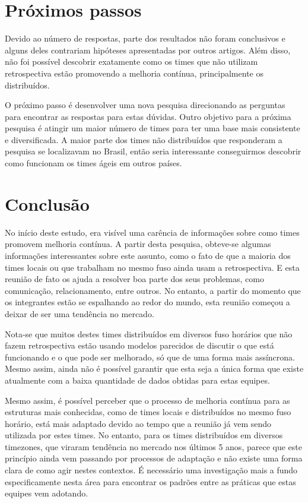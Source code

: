 \documentclass[12pt]{article}
\begin{document}
\section{Próximos passos}

Devido ao número de respostas, parte dos resultados não foram conclusivos e alguns deles contrariam hipóteses apresentadas por outros artigos. Além disso, não foi possível descobrir exatamente como os times que não utilizam retrospectiva estão promovendo a melhoria contínua, principalmente os distribuídos.

O próximo passo é desenvolver uma nova pesquisa direcionando as perguntas para encontrar as respostas para estas dúvidas. Outro objetivo para a próxima pesquisa é atingir um maior número de times para ter uma base mais consistente e diversificada. A maior parte dos times não distribuídos que responderam a pesquisa se localizavam no Brasil, então seria interessante conseguirmos descobrir como funcionam os times ágeis em outros países.

\section{Conclusão}

No início deste estudo, era visível uma carência de informações sobre como times promovem melhoria contínua. A partir desta pesquisa, obteve-se algumas informações interessantes sobre este assunto, como o fato de que a maioria dos times locais ou que trabalham no mesmo fuso ainda usam a retrospectiva. E esta reunião de fato os ajuda a resolver boa parte dos seus problemas, como comunicação, relacionamento, entre outros. No entanto, a partir do momento que os integrantes estão se espalhando ao redor do mundo, esta reunião começou a deixar de ser uma tendência no mercado.

Nota-se que muitos destes times distribuídos em diversos fuso horários que não fazem retrospectiva estão usando modelos parecidos de discutir o que está funcionando e o que pode ser melhorado, só que de uma forma mais assíncrona. Mesmo assim, ainda não é possível garantir que esta seja a única forma que existe atualmente com a baixa quantidade de dados obtidas para estas equipes.

Mesmo assim, é possível perceber que o processo de melhoria contínua para as estruturas mais conhecidas, como de times locais e distribuídos no mesmo fuso horário, está mais adaptado devido ao tempo que a reunião já vem sendo utilizada por estes times. No entanto, para os times distribuídos em diversos timezones, que viraram tendência no mercado nos últimos 5 anos, parece que este princípio ainda vem passando por processos de adaptação e não existe uma forma clara de como agir nestes contextos. É necessário uma investigação mais a fundo especificamente nesta área para encontrar os padrões entre as práticas que estas equipes vem adotando.



\end{document}
